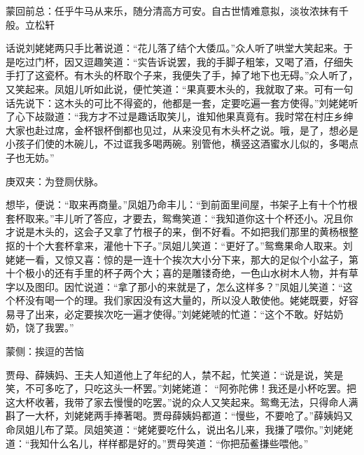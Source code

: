 
\begin{parag}
    \begin{note}蒙回前总：任乎牛马从来乐，随分清高方可安。自古世情难意拟，淡妆浓抹有千般。立松轩\end{note}
\end{parag}


\begin{parag}
    话说刘姥姥两只手比著说道：“花儿落了结个大倭瓜。”众人听了哄堂大笑起来。于是吃过门杯，因又逗趣笑道：“实告诉说罢，我的手脚子粗笨，又喝了酒，仔细失手打了这瓷杯。有木头的杯取个子来，我便失了手，掉了地下也无碍。”众人听了，又笑起来。凤姐儿听如此说，便忙笑道：“果真要木头的，我就取了来。可有一句话先说下：这木头的可比不得瓷的，他都是一套，定要吃遍一套方使得。”刘姥姥听了心下敁敠道：“我方才不过是趣话取笑儿，谁知他果真竟有。我时常在村庄乡绅大家也赴过席，金杯银杯倒都也见过，从来没见有木头杯之说。哦，是了，想必是小孩子们使的木碗儿，不过诓我多喝两碗。别管他，横竖这酒蜜水儿似的，多喝点子也无妨。”\begin{note}庚双夹：为登厕伏脉。\end{note}想毕，便说：“取来再商量。”凤姐乃命丰儿：“到前面里间屋，书架子上有十个竹根套杯取来。”丰儿听了答应，才要去，鸳鸯笑道：“我知道你这十个杯还小。况且你才说是木头的，这会子又拿了竹根子的来，倒不好看。不如把我们那里的黄杨根整抠的十个大套杯拿来，灌他十下子。”凤姐儿笑道：“更好了。”鸳鸯果命人取来。刘姥姥一看，又惊又喜：惊的是一连十个挨次大小分下来，那大的足似个小盆子，第十个极小的还有手里的杯子两个大；喜的是雕镂奇绝，一色山水树木人物，并有草字以及图印。因忙说道：“拿了那小的来就是了，怎么这样多？”凤姐儿笑道：“这个杯没有喝一个的理。我们家因没有这大量的，所以没人敢使他。姥姥既要，好容易寻了出来，必定要挨次吃一遍才使得。”刘姥姥唬的忙道：“这个不敢。好姑奶奶，饶了我罢。”\begin{note}蒙侧：挨逗的苦恼\end{note}贾母、薛姨妈、王夫人知道他上了年纪的人，禁不起，忙笑道：“说是说，笑是笑，不可多吃了，只吃这头一杯罢。”刘姥姥道： “阿弥陀佛！我还是小杯吃罢。把这大杯收著，我带了家去慢慢的吃罢。”说的众人又笑起来。鸳鸯无法，只得命人满斟了一大杯，刘姥姥两手捧著喝。贾母薛姨妈都道：“慢些，不要呛了。”薛姨妈又命凤姐儿布了菜。凤姐笑道：“姥姥要吃什么，说出名儿来，我搛了喂你。”刘姥姥道：“我知什么名儿，样样都是好的。”贾母笑道：“你把茄鲝搛些喂他。” 
\end{parag}
